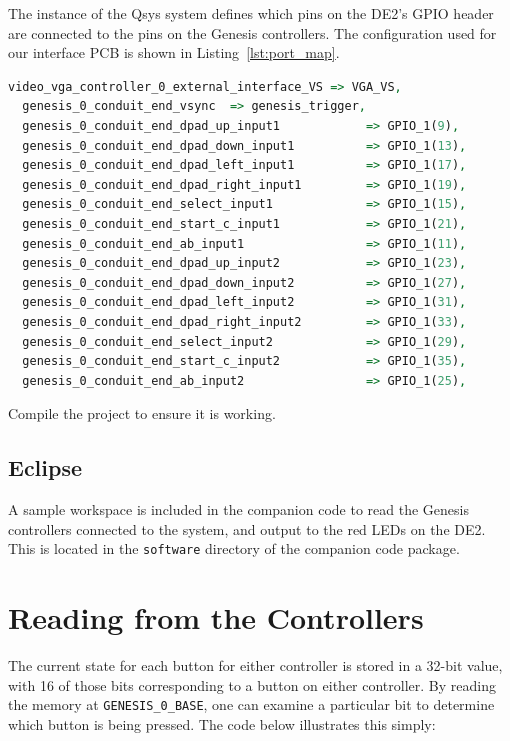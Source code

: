 \documentclass{capstonedoc}
\begin{document}
The instance of the Qsys system defines which pins on the DE2's GPIO header are
connected to the pins on the Genesis controllers. The configuration used for our
interface PCB is shown in Listing~\ref{lst:port_map}.

\begin{lstlisting}[language={vhdl},caption={Port Map Configuration},label={lst:port_map}]
  video_vga_controller_0_external_interface_VS => VGA_VS,
  genesis_0_conduit_end_vsync  => genesis_trigger,
  genesis_0_conduit_end_dpad_up_input1            => GPIO_1(9),
  genesis_0_conduit_end_dpad_down_input1          => GPIO_1(13),
  genesis_0_conduit_end_dpad_left_input1          => GPIO_1(17),
  genesis_0_conduit_end_dpad_right_input1         => GPIO_1(19),
  genesis_0_conduit_end_select_input1             => GPIO_1(15),
  genesis_0_conduit_end_start_c_input1            => GPIO_1(21),
  genesis_0_conduit_end_ab_input1                 => GPIO_1(11),
  genesis_0_conduit_end_dpad_up_input2            => GPIO_1(23),
  genesis_0_conduit_end_dpad_down_input2          => GPIO_1(27),
  genesis_0_conduit_end_dpad_left_input2          => GPIO_1(31),
  genesis_0_conduit_end_dpad_right_input2         => GPIO_1(33),
  genesis_0_conduit_end_select_input2             => GPIO_1(29),
  genesis_0_conduit_end_start_c_input2            => GPIO_1(35),
  genesis_0_conduit_end_ab_input2                 => GPIO_1(25),
\end{lstlisting}

Compile the project to ensure it is working. 

\subsection{Eclipse}

A sample workspace is included in the companion code to read the Genesis
controllers connected to the system, and output to the red LEDs on the DE2.
This is located in the \texttt{software} directory of the companion code
package.

\section{Reading from the Controllers}

The current state for each button for either controller is stored 
in a 32-bit value, with 16 of those bits corresponding to a button 
on either controller. By reading the memory at \texttt{GENESIS\_0\_BASE}, 
one can examine a particular bit to determine which button is being 
pressed. The code below illustrates this simply: 
\end{document}
